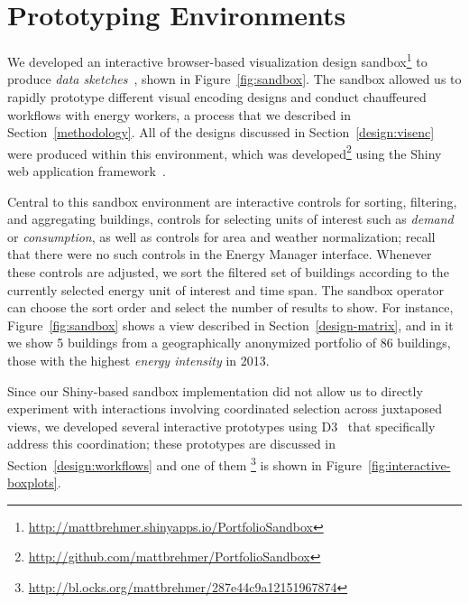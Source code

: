 \documentclass[journal]{vgtc}                %
\newcommand{\bstart}[1]{\vspace{1mm} \noindent{\textbf{#1:}}}
\begin{document}

\section{Prototyping Environments}
\label{sandbox}


\bstart{Shiny sandbox}
We developed an interactive browser-based visualization design sandbox\footnote{\small{\url{http://mattbrehmer.shinyapps.io/PortfolioSandbox}}} to produce {\it data sketches}~\cite{Lloyd2011}, shown in Figure~\ref{fig:sandbox}. 
The sandbox allowed us to rapidly prototype different visual encoding designs and conduct chauffeured workflows with energy workers, a process that we described in Section~\ref{methodology}. 
All of the designs discussed in Section~\ref{design:visenc} were produced within this environment, which was developed\footnote{\small{\url{http://github.com/mattbrehmer/PortfolioSandbox}}} using the Shiny web application framework~\cite{shiny}.

Central to this sandbox environment are interactive controls for sorting, filtering, and aggregating buildings, controls for selecting units of interest such as {\it demand} or {\it consumption}, as well as controls for area and weather normalization; recall that there were no such controls in the Energy Manager interface.
Whenever these controls are adjusted, we sort the filtered set of buildings according to the currently selected energy unit of interest and time span.
The sandbox operator can choose the sort order and select the number of results to show. 
For instance, Figure~\ref{fig:sandbox} shows a view described in Section~\ref{design-matrix}, and in it we show 5 buildings from a geographically anonymized portfolio of 86 buildings, those with the highest {\it energy intensity} in 2013. 

\bstart{D3 interactive prototypes}
Since our Shiny-based sandbox implementation did not allow us to directly experiment with interactions involving coordinated selection across juxtaposed views, we developed several interactive prototypes using D3~\cite{Bostock2011} that specifically address this coordination;  these prototypes are discussed in Section~\ref{design:workflows} and one of them \footnote{\small{\url{http://bl.ocks.org/mattbrehmer/287e44c9a12151967874}}} is shown in Figure~\ref{fig:interactive-boxplots}.
\end{document}

